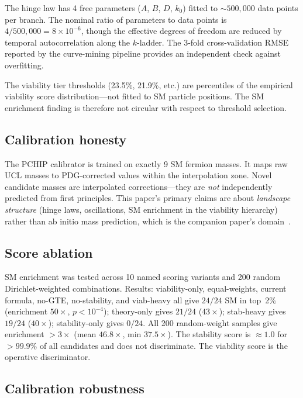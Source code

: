 \documentclass[12pt]{article}
\numberwithin{equation}{section}
\begin{document}
The hinge law has 4 free parameters ($A$, $B$, $D$, $k_0$) fitted to ${\sim}500{,}000$ data points per branch. The nominal ratio of parameters to data points is $4/500{,}000 = 8 \times 10^{-6}$, though the effective degrees of freedom are reduced by temporal autocorrelation along the $k$-ladder. The 3-fold cross-validation RMSE reported by the curve-mining pipeline provides an independent check against overfitting.

The viability tier thresholds (23.5\%, 21.9\%, etc.) are percentiles of the empirical viability score distribution---not fitted to SM particle positions. The SM enrichment finding is therefore not circular with respect to threshold selection.

\subsection{Calibration honesty}

The PCHIP calibrator is trained on exactly 9 SM fermion masses. It maps raw UCL masses to PDG-corrected values within the interpolation zone. Novel candidate masses are interpolated corrections---they are \emph{not} independently predicted from first principles. This paper's primary claims are about \emph{landscape structure} (hinge laws, oscillations, SM enrichment in the viability hierarchy) rather than ab initio mass prediction, which is the companion paper's domain~\cite{SpivackSM}.

\subsection{Score ablation}
\label{sec:score-ablation}

SM enrichment was tested across 10 named scoring variants and 200 random Dirichlet-weighted combinations. Results: viability-only, equal-weights, current formula, no-GTE, no-stability, and viab-heavy all give $24/24$ SM in top~2\% (enrichment $50\times$, $p < 10^{-4}$); theory-only gives $21/24$ ($43\times$); stab-heavy gives $19/24$ ($40\times$); stability-only gives $0/24$. All 200 random-weight samples give enrichment $> 3\times$ (mean $46.8\times$, min $37.5\times$). The stability score is $\approx 1.0$ for $>99.9\%$ of all candidates and does not discriminate. The viability score is the operative discriminator.

\subsection{Calibration robustness}
\label{sec:calibration-robustness}
\end{document}
